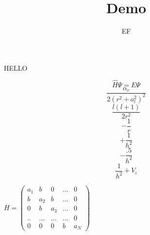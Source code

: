 \documentclass[10pt,a4paper]{article}
\title{Demo}
\author{EF}
\begin{document}
	\maketitle
	HELLO
	
	\[\hat{H}\Psi = E\Psi\]
	\[\frac{\alpha_c}{2(r^2 + a_l^2)^2} \]
	\[\frac{l(l+1)}{2r^2} \]
	\[-\frac{1}{r}\]
	\[+\frac{1}{h^2}\]
	\[-\frac{.5}{h^2}\]
	\[\frac{1}{h^2} + V_{i}\]
	

	$H=\begin{pmatrix}
	 	a_1 & b & 0 & ... & 0\\
	 	b & a_2 & b & ... & 0\\
	 	0 & b & a_3 & ... & 0\\
	 	.. & ... & ... & ... & 0\\
	 	0 & 0 & 0 & b & a_N
	\end{pmatrix}$
\end{document}
